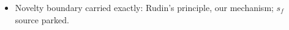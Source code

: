 \begin{itemize}
    \item Novelty boundary carried exactly: Rudin's principle, our mechanism; $s_f$ source parked. 

\end{itemize}
